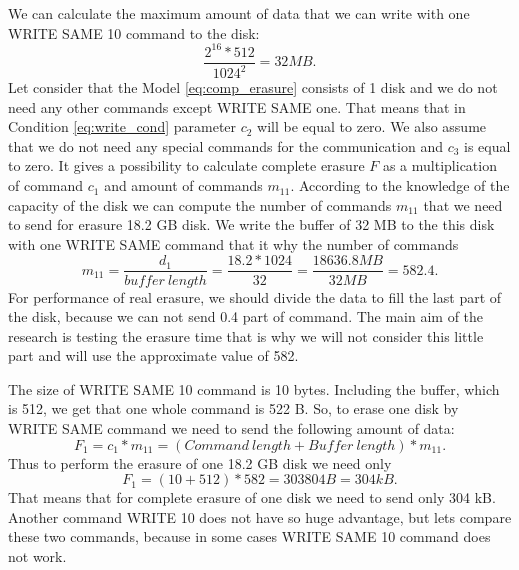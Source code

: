 We can calculate the maximum amount of data that we can write with one WRITE SAME 10 command to the disk:
\begin{equation}
	\frac{2^{16}*512}{1024^2} = 32 MB.
\end{equation}
Let consider that the Model \ref{eq:comp_erasure} consists of 1 disk and we do not need any other commands except WRITE SAME one. That means that in Condition \ref{eq:write_cond} parameter $c_2$ will be equal to zero. We also assume that we do not need any special commands for the communication and $c_3$ is equal to zero. It gives a possibility to calculate complete erasure $F$ as a multiplication of command $c_1$ and amount of commands $m_{11}$. According to the knowledge of the capacity of the disk we can compute the number of commands $m_{11}$ that we need to send for erasure 18.2 GB disk. We write the buffer of 32 MB to the this disk with one WRITE SAME command that it why the number of commands
\begin{equation}
	m_{11} =\frac{d_1}{buffer~length} = \frac{18.2*1024}{32} = \frac{18636.8MB}{32MB} = 582.4.
\end{equation}
For performance of real erasure, we should divide the data to fill the last part of the disk, because we can not send 0.4 part of command. The main aim of the research is testing the erasure time that is why we will not consider this little part and will use the approximate value of 582.

The size of WRITE SAME 10 command is 10 bytes. Including the buffer, which is 512, we get that one whole command is 522 B.
So, to erase one disk by WRITE SAME command we need to send the following amount of data:\begin{equation}
	F_1 = c_1*m_{11} = (Command~length + Buffer~length)*m_{11}.
\end{equation}
Thus to perform the erasure of one 18.2 GB disk we need only
\begin{equation}
	F_1 = (10 + 512)*582 = 303804 B = 304 kB.
\end{equation}
That means that for complete erasure of one disk we need to send only 304 kB. Another command WRITE 10 does not have so huge advantage, but lets compare these two commands, because in some cases WRITE SAME 10 command does not work.


